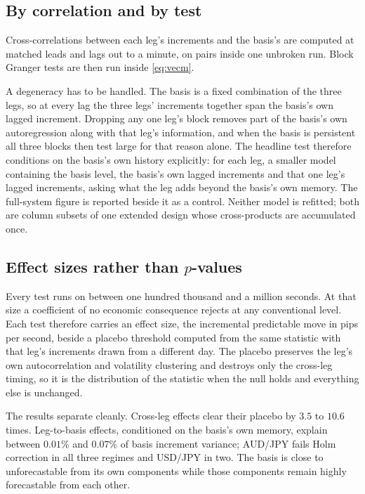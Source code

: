 \documentclass[11pt,a4paper]{article}
\begin{document}
\subsection{By correlation and by test}

Cross-correlations between each leg's increments and the basis's are computed at matched
leads and lags out to a minute, on pairs inside one unbroken run. Block Granger tests are
then run inside \eqref{eq:vecm}.

A degeneracy has to be handled. The basis is a fixed combination of the three legs, so at
every lag the three legs' increments together span the basis's own lagged increment.
Dropping any one leg's block removes part of the basis's own autoregression along with that
leg's information, and when the basis is persistent all three blocks then test large for
that reason alone. The headline test therefore conditions on the basis's own history
explicitly: for each leg, a smaller model containing the basis level, the basis's own lagged
increments and that one leg's lagged increments, asking what the leg adds beyond the basis's
own memory. The full-system figure is reported beside it as a control. Neither model is
refitted; both are column subsets of one extended design whose cross-products are
accumulated once.

\subsection{Effect sizes rather than $p$-values}

Every test runs on between one hundred thousand and a million seconds. At that size a
coefficient of no economic consequence rejects at any conventional level. Each test
therefore carries an effect size, the incremental predictable move in pips per second,
beside a placebo threshold computed from the same statistic with that leg's increments drawn
from a different day. The placebo preserves the leg's own autocorrelation and volatility
clustering and destroys only the cross-leg timing, so it is the distribution of the
statistic when the null holds and everything else is unchanged.

The results separate cleanly. Cross-leg effects clear their placebo by $3.5$ to $10.6$
times. Leg-to-basis effects, conditioned on the basis's own memory, explain between $0.01\%$
and $0.07\%$ of basis increment variance; AUD/JPY fails Holm correction in all three regimes
and USD/JPY in two. The basis is close to unforecastable from its own components while those
components remain highly forecastable from each other.
\end{document}
